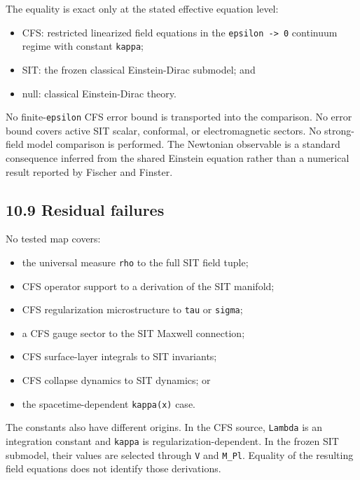 \documentclass[
  american,
  11pt,
  letterpaper,
]{article}
\providecommand{\tightlist}{%
  \setlength{\itemsep}{0pt}\setlength{\parskip}{0pt}}
\begin{document}
The equality is exact only at the stated effective equation level:

\begin{itemize}
\tightlist
\item
  CFS: restricted linearized field equations in the \texttt{epsilon\ -\textgreater{}\ 0} continuum regime with constant \texttt{kappa};
\item
  SIT: the frozen classical Einstein-Dirac submodel; and
\item
  null: classical Einstein-Dirac theory.
\end{itemize}

No finite-\texttt{epsilon} CFS error bound is transported into the comparison. No error bound covers active SIT scalar, conformal, or electromagnetic sectors. No strong-field model comparison is performed. The Newtonian observable is a standard consequence inferred from the shared Einstein equation rather than a numerical result reported by Fischer and Finster.

\subsection{10.9 Residual failures}\label{residual-failures}

No tested map covers:

\begin{itemize}
\tightlist
\item
  the universal measure \texttt{rho} to the full SIT field tuple;
\item
  CFS operator support to a derivation of the SIT manifold;
\item
  CFS regularization microstructure to \texttt{tau} or \texttt{sigma};
\item
  a CFS gauge sector to the SIT Maxwell connection;
\item
  CFS surface-layer integrals to SIT invariants;
\item
  CFS collapse dynamics to SIT dynamics; or
\item
  the spacetime-dependent \texttt{kappa(x)} case.
\end{itemize}

The constants also have different origins. In the CFS source, \texttt{Lambda} is an integration constant and \texttt{kappa} is regularization-dependent. In the frozen SIT submodel, their values are selected through \texttt{V} and \texttt{M\_Pl}. Equality of the resulting field equations does not identify those derivations.
\end{document}
